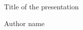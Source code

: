 \documentclass{slides}
\begin{document}

\begin{slide}
\centerline{Title of the presentation}
\medskip
\centerline{Author name} 
\end{slide} 

\end{document}
